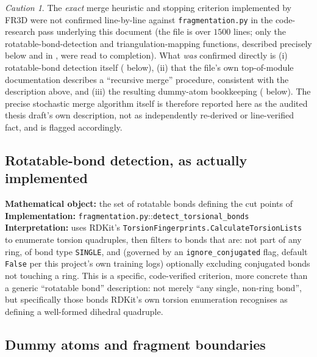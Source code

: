 \documentclass[11pt,a4paper]{report}
\theoremstyle{definition}
\theoremstyle{remark}
\newtheorem{caution}[caution]{Caution}
\newcommand{\file}[1]{\texttt{#1}}
\newcommand{\pyfunc}[1]{\texttt{#1}}
\begin{document}
\begin{caution}
The \emph{exact} merge heuristic and stopping criterion implemented by
FR3D were not confirmed line-by-line against
\file{fragmentation.py} in the code-research pass underlying this
document (the file is over $1500$ lines; only the rotatable-bond-detection
and triangulation-mapping functions, described precisely below and in
, were read to completion). What
\emph{was} confirmed directly is (i) rotatable-bond detection itself
( below), (ii) that the file's own
top-of-module documentation describes a ``recursive merge'' procedure,
consistent with the description above, and (iii) the resulting dummy-atom
bookkeeping ( below). The precise
stochastic merge algorithm itself is therefore reported here as the
audited thesis draft's own description, not as independently re-derived
or line-verified fact, and is flagged accordingly.
\end{caution}

\subsection{Rotatable-bond detection, as actually implemented}
\label{sec:sigmadock-torsion-detection}

\begin{codebox}
\textbf{Mathematical object:} the set of rotatable bonds defining the cut
points of  \\
\textbf{Implementation:} \file{fragmentation.py}::\pyfunc{detect\_torsional\_bonds} \\
\textbf{Interpretation:} uses RDKit's \pyfunc{TorsionFingerprints.CalculateTorsionLists}
to enumerate torsion quadruples, then filters to bonds that are: not part
of any ring, of bond type \texttt{SINGLE}, and (governed by an
\texttt{ignore\_conjugated} flag, default \texttt{False} per this
project's own training logs) optionally excluding conjugated bonds not
touching a ring. This is a specific, code-verified criterion, more
concrete than a generic ``rotatable bond'' description: not merely ``any
single, non-ring bond'', but specifically those bonds RDKit's own torsion
enumeration recognises as defining a well-formed dihedral quadruple.
\end{codebox}

\subsection{Dummy atoms and fragment boundaries}
\label{sec:sigmadock-fr3d-dummies}
\end{document}
